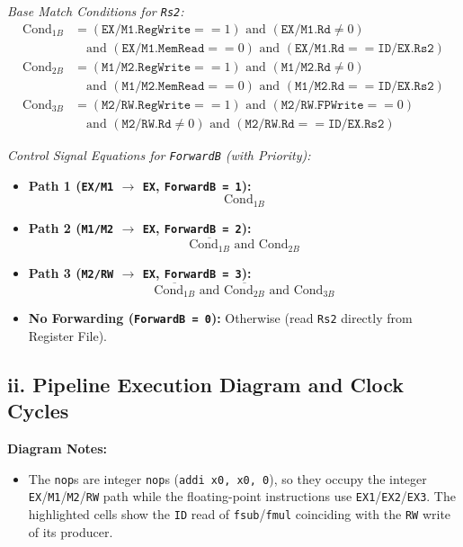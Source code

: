 \documentclass[11pt, a4paper]{article}
\begin{document}
\textit{Base Match Conditions for \texttt{Rs2}:}
\begin{align*}
    \text{Cond}_{1B} &= (\texttt{EX/M1.RegWrite} == 1) \text{ and } (\texttt{EX/M1.Rd} \neq 0) \\
                     &\quad \text{and } (\texttt{EX/M1.MemRead} == 0) \text{ and } (\texttt{EX/M1.Rd} == \texttt{ID/EX.Rs2}) \\
    \text{Cond}_{2B} &= (\texttt{M1/M2.RegWrite} == 1) \text{ and } (\texttt{M1/M2.Rd} \neq 0) \\
                     &\quad \text{and } (\texttt{M1/M2.MemRead} == 0) \text{ and } (\texttt{M1/M2.Rd} == \texttt{ID/EX.Rs2}) \\
    \text{Cond}_{3B} &= (\texttt{M2/RW.RegWrite} == 1) \text{ and } (\texttt{M2/RW.FPWrite} == 0) \\
                     &\quad \text{and } (\texttt{M2/RW.Rd} \neq 0) \text{ and } (\texttt{M2/RW.Rd} == \texttt{ID/EX.Rs2})
\end{align*}

\textit{Control Signal Equations for \texttt{ForwardB} (with Priority):}
\begin{itemize}[noitemsep, topsep=2pt]
    \item \textbf{Path 1 (\texttt{EX/M1} $\rightarrow$ \texttt{EX}, \texttt{ForwardB = 1}):}
    \[
        \text{Cond}_{1B}
    \]
    \item \textbf{Path 2 (\texttt{M1/M2} $\rightarrow$ \texttt{EX}, \texttt{ForwardB = 2}):}
    \[
        \overline{\text{Cond}_{1B}} \text{ and } \text{Cond}_{2B}
    \]
    \item \textbf{Path 3 (\texttt{M2/RW} $\rightarrow$ \texttt{EX}, \texttt{ForwardB = 3}):}
    \[
        \overline{\text{Cond}_{1B}} \text{ and } \overline{\text{Cond}_{2B}} \text{ and } \text{Cond}_{3B}
    \]
    \item \textbf{No Forwarding (\texttt{ForwardB = 0}):} Otherwise (read \texttt{Rs2} directly from Register File).
\end{itemize}

\vspace{8pt}
\subsection*{ii. Pipeline Execution Diagram and Clock Cycles}


\textbf{Diagram Notes:}
\begin{itemize}[noitemsep, topsep=2pt]
    \item The \texttt{nop}s are integer \texttt{nop}s (\texttt{addi x0, x0, 0}), so they occupy the integer \texttt{EX}/\texttt{M1}/\texttt{M2}/\texttt{RW} path while the floating-point instructions use \texttt{EX1}/\texttt{EX2}/\texttt{EX3}. The highlighted cells show the \texttt{ID} read of \texttt{fsub}/\texttt{fmul} coinciding with the \texttt{RW} write of its producer.
\end{itemize}
\end{document}
